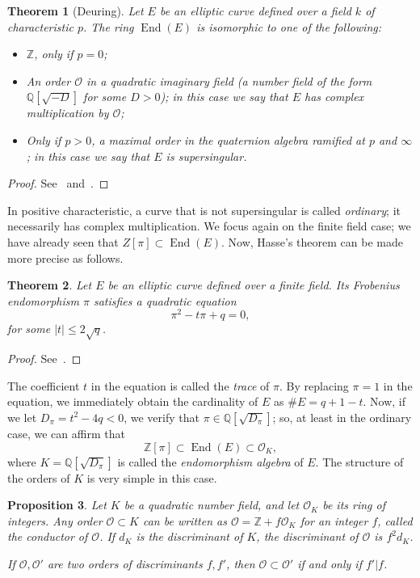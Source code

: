 \documentclass[10pt]{article}
\theoremstyle{plain}
\newtheorem{theorem}{Theorem}
\newtheorem{proposition}[theorem]{Proposition}
\theoremstyle{definition}
\DeclareMathOperator{\End}{End} %
\def\O{\ensuremath{\mathcal{O}}}
\begin{document}
\begin{theorem}[Deuring]
  Let $E$ be an elliptic curve defined over a field $k$ of
  characteristic $p$. %
  The ring $\End(E)$ is isomorphic to one of the following:
  \begin{itemize}
  \item $ℤ$, only if $p=0$;
  \item An order $\O$ in a quadratic imaginary field (a number field
    of the form $ℚ[\sqrt{-D}]$ for some $D>0$); in this case we say
    that $E$ has \emph{complex multiplication} by $\O$;
  \item Only if $p>0$, a maximal order in the quaternion algebra
    ramified at $p$ and $∞$; in this case we say that $E$ is
    \emph{supersingular}.
  \end{itemize}
\end{theorem}
\begin{proof}
  See~\cite[III, Coro.~9.4]{silverman:elliptic}
  and~\cite{belding08-thesis}.
\end{proof}

In positive characteristic, a curve that is not supersingular is
called \emph{ordinary}; it necessarily has complex multiplication. %
We focus again on the finite field case; we have already seen that
$Ζ[π]⊂\End(E)$. %
Now, Hasse's theorem can be made more precise as follows.

\begin{theorem}
  Let $E$ be an elliptic curve defined over a finite field. %
  Its Frobenius endomorphism $π$ satisfies a quadratic equation
  \[π^2 - tπ + q = 0,\]
  for some $|t|≤2\sqrt{q}$.
\end{theorem}
\begin{proof}
  See~\cite[V, Th.~2.3.1]{silverman:elliptic}.
\end{proof}

The coefficient $t$ in the equation is called the \emph{trace} of
$π$. %
By replacing $π=1$ in the equation, we immediately obtain the
cardinality of $E$ as $\#E = q+1-t$. %
Now, if we let $D_π=t^2-4q<0$, we verify that $π∈ℚ[\sqrt{D_π}]$; so,
at least in the ordinary case, we can affirm that
\[ℤ[π] ⊂ \End(E) ⊂ \O_K,\] %
where $K=ℚ[\sqrt{D_π}]$ is called the \emph{endomorphism algebra} of
$E$. %
The structure of the orders of $K$ is very simple in this case.

\begin{proposition}
  Let $K$ be a quadratic number field, and let $\O_K$ be its ring of
  integers. %
  Any order $\O⊂K$ can be written as $\O=ℤ+f\O_K$ for an integer $f$,
  called the \emph{conductor} of $\O$. %
  If $d_K$ is the \emph{discriminant} of $K$, the discriminant of $\O$
  is $f^2d_K$.

  If $\O,\O'$ are two orders of discriminants $f,f'$, then $\O⊂\O'$ if
  and only if $f'|f$.
\end{proposition}
\end{document}
